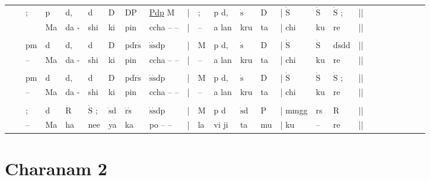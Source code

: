 \documentclass[12pt]{article}
\newcommand*\od[1]{\mathrm{\dot{#1}}}
\begin{document}
\begin{tabu}{l l l l l l l l l l l l l l l l l l l l l l l l l }

&&;&p&d,&d&D&DP&\underline{Pdp} M&|&;& p d,&$\od{s}$&D&| $\od{S}$&$\od{S}$& $\od{S}$ ;&||\\
\rowfont{\scriptsize}&& &Ma&da -&shi&ki&pin&ccha -- --&|&--&a lan& kru&ta&| chi&ku& re&||\\
\\
&&pm&d&d,&d&D&pd$\od{r}$$\od{s}$&$\od{s}$$\od{s}$dp&|&M&p d,&$\od{s}$&D&| $\od{S}$&$\od{S}$& d$\od{s}$dd&||\\
\rowfont{\scriptsize}&&--&Ma&da -&shi&ki&pin&ccha -- --&|&--&a lan& kru&ta&| chi&ku& re&||\\
\\
&&pm&d&d,&d&D&pd$\od{r}$$\od{s}$&$\od{s}$$\od{s}$dp&|&M&p d,&$\od{s}$&D&| $\od{S}$&$\od{S}$& $\od{S}$ ;&||\\
\rowfont{\scriptsize}&&--&Ma&da -&shi&ki&pin&ccha -- --&|&--&a lan& kru&ta&| chi&ku& re&||\\
\\
&&;&d&$\od{R}$&$\od{S}$ ;&$\od{s}$d&$\od{r}$$\od{s}$&$\od{s}$$\od{s}$dp&|&M&p d&$\od{s}$d&P&| mmgg&rs& R&||\\
\rowfont{\scriptsize}&&--&Ma&ha&nee&ya&ka&po -- --&|&la&vi ji& ta&mu&| ku&--& re&||\\
\end{tabu}

\section*{Charanam 2}
\end{document}
